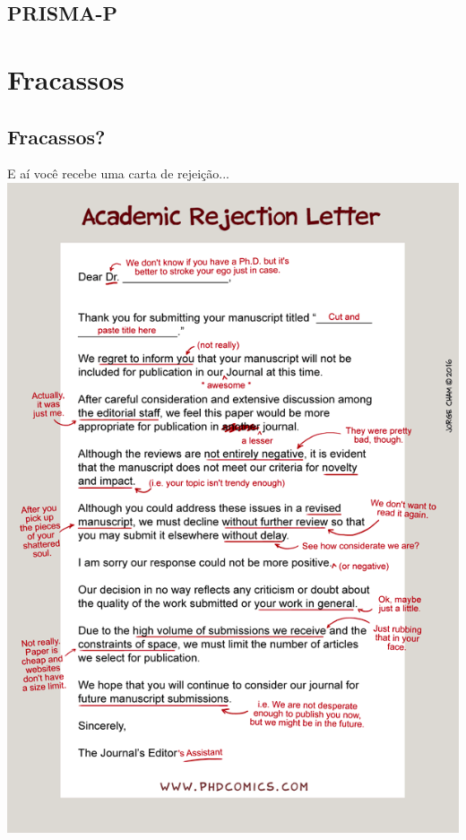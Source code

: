 \documentclass{beamer}
\begin{document}
\subsection{PRISMA-P}

\section{Fracassos}

\subsection{Fracassos?}

\begin{frame}{E aí você recebe uma carta de rejeição...}
  \centering
  \includegraphics[height=\textheight]{Planejamento/phd071316s}
\end{frame}
\end{document}
